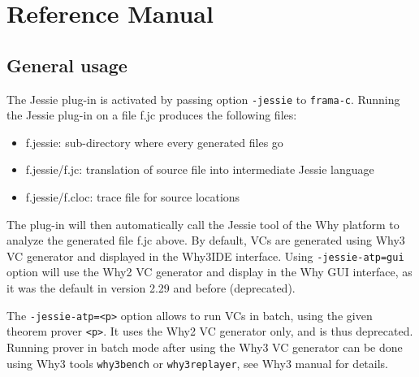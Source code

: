 \documentclass[a4paper,11pt,twoside,openright]{report}
\begin{document}

% 


% 


\chapter{Reference Manual}

\section{General usage}
\label{sec:general}

The Jessie plug-in is activated by passing option
\verb|-jessie| to \verb|frama-c|. Running the Jessie plug-in
on a file f.jc produces the following files:

\begin{itemize}
\item f.jessie: sub-directory where every generated files go
\item f.jessie/f.jc: translation of source file into intermediate Jessie language
\item f.jessie/f.cloc: trace file for source locations
\end{itemize}

The plug-in will then automatically call the Jessie tool of the Why
platform to analyze the generated file f.jc above. By default, VCs are
generated using Why3 VC generator and displayed in the Why3IDE
interface. Using \verb|-jessie-atp=gui| option will use the Why2 VC
generator and display in the Why GUI interface, as it was the default
in version 2.29 and before (deprecated).

The \verb|-jessie-atp=<p>| option allows to run VCs in batch, using
the given theorem prover \texttt{<p>}. It uses the Why2 VC
generator only, and is thus deprecated. Running prover in batch mode
after using the Why3 VC generator can be done using Why3 tools
\verb|why3bench| or \verb|why3replayer|, see Why3 manual for details.
\end{document}
